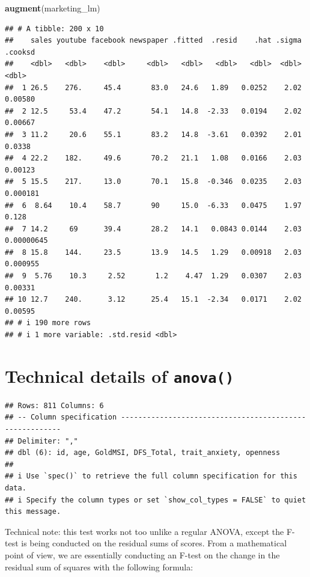 \documentclass[
]{book}
\newenvironment{Shaded}{\begin{snugshade}}{\end{snugshade}}
\newcommand{\FunctionTok}[1]{\textcolor[rgb]{0.13,0.29,0.53}{\textbf{#1}}}
\newcommand{\NormalTok}[1]{#1}
\begin{document}
\begin{Shaded}
\begin{Highlighting}[]
\FunctionTok{augment}\NormalTok{(marketing\_lm)}
\end{Highlighting}
\end{Shaded}

\begin{verbatim}
## # A tibble: 200 x 10
##    sales youtube facebook newspaper .fitted  .resid    .hat .sigma    .cooksd
##    <dbl>   <dbl>    <dbl>     <dbl>   <dbl>   <dbl>   <dbl>  <dbl>      <dbl>
##  1 26.5    276.     45.4       83.0   24.6   1.89   0.0252    2.02 0.00580   
##  2 12.5     53.4    47.2       54.1   14.8  -2.33   0.0194    2.02 0.00667   
##  3 11.2     20.6    55.1       83.2   14.8  -3.61   0.0392    2.01 0.0338    
##  4 22.2    182.     49.6       70.2   21.1   1.08   0.0166    2.03 0.00123   
##  5 15.5    217.     13.0       70.1   15.8  -0.346  0.0235    2.03 0.000181  
##  6  8.64    10.4    58.7       90     15.0  -6.33   0.0475    1.97 0.128     
##  7 14.2     69      39.4       28.2   14.1   0.0843 0.0144    2.03 0.00000645
##  8 15.8    144.     23.5       13.9   14.5   1.29   0.00918   2.03 0.000955  
##  9  5.76    10.3     2.52       1.2    4.47  1.29   0.0307    2.03 0.00331   
## 10 12.7    240.      3.12      25.4   15.1  -2.34   0.0171    2.02 0.00595   
## # i 190 more rows
## # i 1 more variable: .std.resid <dbl>
\end{verbatim}

\hypertarget{technical-details-of-anova}{%
\chapter{\texorpdfstring{Technical details of \texttt{anova()}}{Technical details of anova()}}\label{technical-details-of-anova}}

\begin{verbatim}
## Rows: 811 Columns: 6
## -- Column specification --------------------------------------------------------
## Delimiter: ","
## dbl (6): id, age, GoldMSI, DFS_Total, trait_anxiety, openness
## 
## i Use `spec()` to retrieve the full column specification for this data.
## i Specify the column types or set `show_col_types = FALSE` to quiet this message.
\end{verbatim}

Technical note: this test works not too unlike a regular ANOVA, except the F-test is being conducted on the residual sums of scores. From a mathematical point of view, we are essentially conducting an F-test on the change in the residual sum of squares with the following formula:
\end{document}
